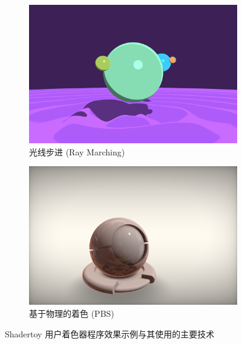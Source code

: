 \begin{figure}[htbp]
    
    \begin{minipage}[b]{\textwidth}
        \begin{subfigure}[b]{0.48\textwidth}
            \includegraphics[width=\textwidth]{figures/shadertoy_raymarching.png}
            \caption{光线步进 (Ray Marching)}
            \label{fig:sub_raymarching}
        \end{subfigure}
        \hfill %
        \begin{subfigure}[b]{0.48\textwidth}
            \includegraphics[width=\textwidth]{figures/shadertoy_pbr.png}
            \caption{基于物理的着色 (PBS)}
            \label{fig:sub_pbs}
        \end{subfigure}
    \end{minipage}
    
    \caption{Shadertoy 用户\cite{ShdrToyUser1, ShdrToyUser2}着色器程序效果示例与其使用的主要技术}
    \label{fig:shadertoy_gallery}
\end{figure}

